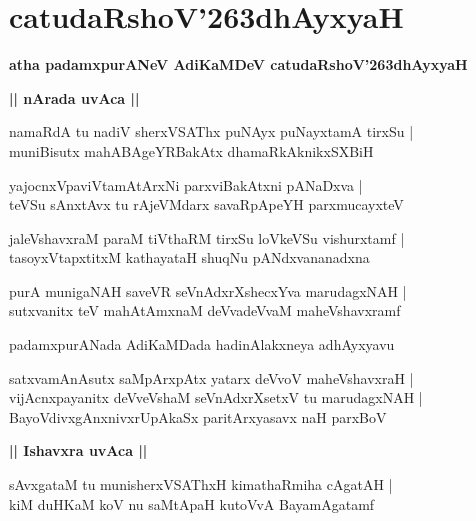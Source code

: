 \documentclass[twoside,12pt,openright]{book}
\def\S{\char'263}
\newcounter{shloka}[chapter]
\def\uvaca#1{\centerline{{\large\textbf{#1}}}}
\begin{document}
\chapter{catudaRshoV\S dhAyxyaH}

\begin{center}
{\LARGE\bfseries atha padamxpurANeV AdiKaMDeV catudaRshoV\S dhAyxyaH}
\end{center}

\uvaca{|| nArada uvAca ||}

\begin{shloka}
namaRdA tu nadiV sherxVSAThx puNAyx puNayxtamA tirxSu |\\
muniBisutx mahABAgeYRBakAtx dhamaRkAknikxSXBiH 
\end{shloka}

\begin{shloka}
yajocnxVpaviVtamAtArxNi parxviBakAtxni pANaDxva |\\
teVSu sAnxtAvx tu rAjeVMdarx savaRpApeYH parxmucayxteV
\end{shloka}

\begin{shloka}
jaleVshavxraM paraM tiVthaRM tirxSu loVkeVSu vishurxtamf |\\
tasoyxVtapxtitxM kathayataH shuqNu pANdxvananadxna 
\end{shloka}

\begin{shloka}
purA munigaNAH saveVR seVnAdxrXshecxYva marudagxNAH |\\
sutxvanitx teV mahAtAmxnaM deVvadeVvaM maheVshavxramf
\end{shloka}


\begin{center}
padamxpurANada AdiKaMDada hadinAlakxneya adhAyxyavu
\end{center}

\begin{shloka}
satxvamAnAsutx saMpArxpAtx yatarx deVvoV maheVshavxraH |\\
vijAcnxpayanitx deVveVshaM seVnAdxrXsetxV tu marudagxNAH |\\
BayoVdivxgAnxnivxrUpAkaSx paritArxyasavx naH parxBoV 
\end{shloka}

\uvaca{|| Ishavxra uvAca ||}
\begin{shloka}
sAvxgataM tu munisherxVSAThxH kimathaRmiha cAgatAH |\\
kiM duHKaM koV nu saMtApaH kutoVvA BayamAgatamf 
\end{shloka}
\end{document}
